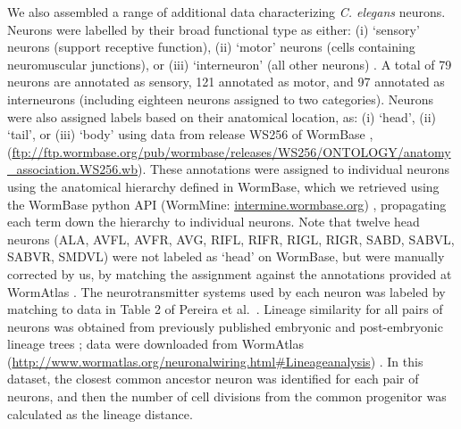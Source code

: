 \documentclass[10pt,letterpaper]{article}
\begin{document}
We also assembled a range of additional data characterizing \emph{C. elegans} neurons.
Neurons were labelled by their broad functional type as either:
(i) `sensory' neurons (support receptive function),
(ii) `motor' neurons (cells containing neuromuscular junctions), or
(iii) `interneuron' (all other neurons) \cite{White:1986tx}.
A total of 79 neurons are annotated as sensory, 121 annotated as motor, and 97 annotated as interneurons (including eighteen neurons assigned to two categories).
Neurons were also assigned labels based on their anatomical location, as:
(i) `head', (ii) `tail', or (iii) `body' using data from release WS256 of WormBase \cite{Harris:2009kd}, (\url{ftp://ftp.wormbase.org/pub/wormbase/releases/WS256/ONTOLOGY/anatomy_association.WS256.wb}).
These annotations were assigned to individual neurons using the anatomical hierarchy defined in WormBase, which we retrieved using the WormBase python API (WormMine: \url{intermine.wormbase.org}) \cite{Harris:2009kd}, propagating each term down the hierarchy to individual neurons.
Note that twelve head neurons (ALA, AVFL, AVFR, AVG, RIFL, RIFR, RIGL, RIGR, SABD, SABVL, SABVR, SMDVL) were not labeled as `head' on WormBase, but were manually corrected by us, by matching the assignment against the annotations provided at WormAtlas \cite{WormAtlas}.
The neurotransmitter systems used by each neuron was labeled by matching to data in Table 2 of Pereira et al.~\cite{Pereira:2015er}.
Lineage similarity for all pairs of neurons was obtained from previously published embryonic and post-embryonic lineage trees \cite{Sulston1977, Sulston1983}; data were downloaded from WormAtlas (\url{http://www.wormatlas.org/neuronalwiring.html#Lineageanalysis}) \cite{WormAtlas}.
In this dataset, the closest common ancestor neuron was identified for each pair of neurons, and then the number of cell divisions from the common progenitor was calculated as the lineage distance.
\end{document}
